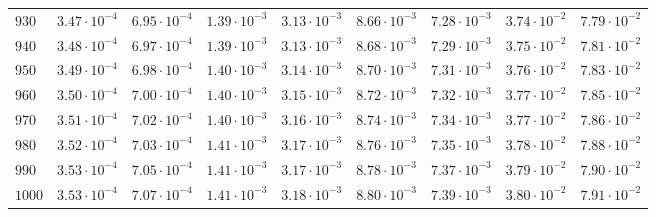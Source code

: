 \begin{landscape}
\begin{table}
\begin{tabular}{lcccccccc}
$	930	$ & $	3.47 \cdot 10^{-4}	$ & $	6.95 \cdot 10^{-4}	$ & $	1.39 \cdot 10^{-3}	$ & $	3.13 \cdot 10^{-3}	$ & $	8.66 \cdot 10^{-3}	$ & $	7.28 \cdot 10^{-3}	$ & $	3.74 \cdot 10^{-2}	$ & $	7.79 \cdot 10^{-2}	 $ \\
$	940	$ & $	3.48 \cdot 10^{-4}	$ & $	6.97 \cdot 10^{-4}	$ & $	1.39 \cdot 10^{-3}	$ & $	3.13 \cdot 10^{-3}	$ & $	8.68 \cdot 10^{-3}	$ & $	7.29 \cdot 10^{-3}	$ & $	3.75 \cdot 10^{-2}	$ & $	7.81 \cdot 10^{-2}	 $ \\
$	950	$ & $	3.49 \cdot 10^{-4}	$ & $	6.98 \cdot 10^{-4}	$ & $	1.40 \cdot 10^{-3}	$ & $	3.14 \cdot 10^{-3}	$ & $	8.70 \cdot 10^{-3}	$ & $	7.31 \cdot 10^{-3}	$ & $	3.76 \cdot 10^{-2}	$ & $	7.83 \cdot 10^{-2}	 $ \\
$	960	$ & $	3.50 \cdot 10^{-4}	$ & $	7.00 \cdot 10^{-4}	$ & $	1.40 \cdot 10^{-3}	$ & $	3.15 \cdot 10^{-3}	$ & $	8.72 \cdot 10^{-3}	$ & $	7.32 \cdot 10^{-3}	$ & $	3.77 \cdot 10^{-2}	$ & $	7.85 \cdot 10^{-2}	 $ \\
$	970	$ & $	3.51 \cdot 10^{-4}	$ & $	7.02 \cdot 10^{-4}	$ & $	1.40 \cdot 10^{-3}	$ & $	3.16 \cdot 10^{-3}	$ & $	8.74 \cdot 10^{-3}	$ & $	7.34 \cdot 10^{-3}	$ & $	3.77 \cdot 10^{-2}	$ & $	7.86 \cdot 10^{-2}	 $ \\
$	980	$ & $	3.52 \cdot 10^{-4}	$ & $	7.03 \cdot 10^{-4}	$ & $	1.41 \cdot 10^{-3}	$ & $	3.17 \cdot 10^{-3}	$ & $	8.76 \cdot 10^{-3}	$ & $	7.35 \cdot 10^{-3}	$ & $	3.78 \cdot 10^{-2}	$ & $	7.88 \cdot 10^{-2}	 $ \\
$	990	$ & $	3.53 \cdot 10^{-4}	$ & $	7.05 \cdot 10^{-4}	$ & $	1.41 \cdot 10^{-3}	$ & $	3.17 \cdot 10^{-3}	$ & $	8.78 \cdot 10^{-3}	$ & $	7.37 \cdot 10^{-3}	$ & $	3.79 \cdot 10^{-2}	$ & $	7.90 \cdot 10^{-2}	 $ \\
$	1000	$ & $	3.53 \cdot 10^{-4}	$ & $	7.07 \cdot 10^{-4}	$ & $	1.41 \cdot 10^{-3}	$ & $	3.18 \cdot 10^{-3}	$ & $	8.80 \cdot 10^{-3}	$ & $	7.39 \cdot 10^{-3}	$ & $	3.80 \cdot 10^{-2}	$ & $	7.91 \cdot 10^{-2}	 $ \\
\hline
  \end{tabular}
  \end{table}
\end{landscape}

